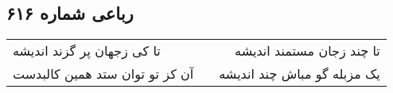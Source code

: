 \begin{center}
\section*{رباعی شماره ۶۱۶}
\label{sec:sh616}
\begin{longtable}{l p{0.5cm} r}
تا کی زجهان پر گزند اندیشه
&&
تا چند زجان مستمند اندیشه
\\
آن کز تو توان ستد همین کالبدست
&&
یک مزبله گو مباش چند اندیشه
\\
\end{longtable}
\end{center}
